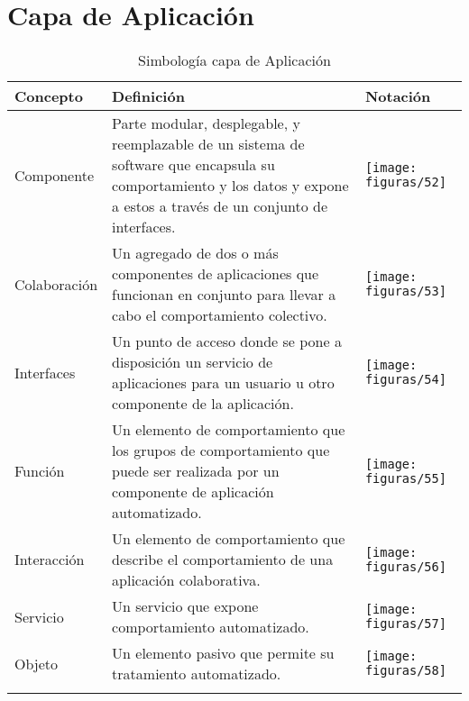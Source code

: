 \section{Capa de Aplicación}
  \begin{longtable}
  	{m{3cm}m{4.8cm}m{5.2cm}}
  	\hline
  	\rowcolor[HTML]{0073a1}
  	{\color[HTML]{FFFFFF} \textbf{Concepto}} & {\color[HTML]{FFFFFF} \textbf{Definición}} & {\color[HTML]{FFFFFF} \textbf{Notación}} \\
  	\hline
	Componente & Parte modular, desplegable, y reemplazable de un sistema de software que encapsula su comportamiento y los datos y expone a estos a través de un conjunto de interfaces. & \texttt{[image: figuras/52]} \\ \hline
	Colaboración\index{Colaboración} & Un agregado de dos o más componentes de aplicaciones que funcionan en conjunto para llevar a cabo el comportamiento colectivo. & \texttt{[image: figuras/53]} \\ \hline
	Interface\index{Interface}s & Un punto de acceso donde se pone a disposición un servicio de aplicaciones para un usuario u otro componente de la aplicación. & \texttt{[image: figuras/54]} \\ \hline
	Función & Un elemento de comportamiento que los grupos de comportamiento que puede ser realizada por un componente de aplicación automatizado. & \texttt{[image: figuras/55]} \\ \hline
	Interacción & Un elemento de comportamiento que describe el comportamiento de una aplicación colaborativa. & \texttt{[image: figuras/56]} \\ \hline
	Servicio\index{Servicio} & Un servicio que expone comportamiento automatizado. & \texttt{[image: figuras/57]} \\ \hline
	Objeto & Un elemento pasivo que permite su tratamiento automatizado. & \texttt{[image: figuras/58]} \\
	\bottomrule
	\captionsetup{width=.95\textwidth}
	\caption{Simbología\index{Simbología} capa de Aplicación\index{Aplicación} \cite{ref9}}
	\label{tabla30}
  \end{longtable}

\newpage
